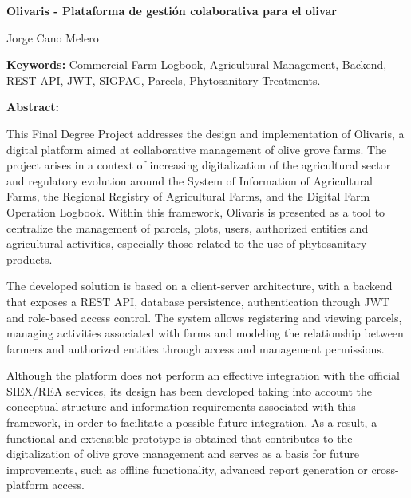 \newpage
\begin{center}
    {\large \textbf{Olivaris - Plataforma de gestión colaborativa para el olivar}}

    \vspace{0.2cm}
    {\normalsize Jorge Cano Melero}

    \vspace{0.2cm}
\end{center}

\vspace{0.5cm}

\textbf{Keywords:} Commercial Farm Logbook, Agricultural Management, Backend, REST API, JWT, SIGPAC, Parcels, Phytosanitary Treatments.

\vspace{0.5cm}

\textbf{Abstract:}

This Final Degree Project addresses the design and implementation of Olivaris, a digital platform aimed at collaborative management of olive grove farms. The project arises in a context of increasing digitalization of 
the agricultural sector and regulatory evolution around the System of Information of Agricultural Farms, the Regional Registry of Agricultural Farms, and the Digital Farm Operation Logbook. Within this framework, Olivaris 
is presented as a tool to centralize the management of parcels, plots, users, authorized entities and agricultural activities, especially those related to the use of phytosanitary products.

The developed solution is based on a client-server architecture, with a backend that exposes a REST API, database persistence, authentication through JWT and role-based access control. The system allows registering and viewing 
parcels, managing activities associated with farms and modeling the relationship between farmers and authorized entities through access and management permissions.

Although the platform does not perform an effective integration with the official SIEX/REA services, its design has been developed taking into account the conceptual structure and information requirements associated with this 
framework, in order to facilitate a possible future integration. As a result, a functional and extensible prototype is obtained that contributes to the digitalization of olive grove management and serves as a basis for future 
improvements, such as offline functionality, advanced report generation or cross-platform access.